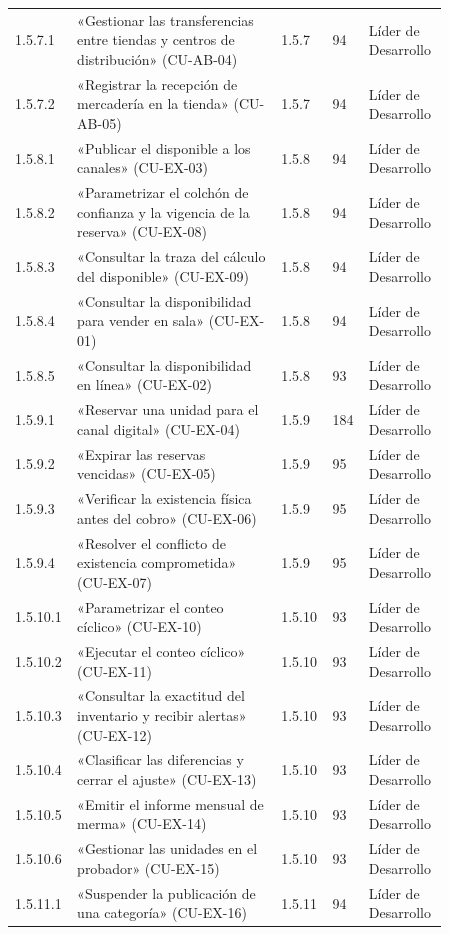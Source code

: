 \begin{longtable}{@{}p{0.075\linewidth}p{0.451\linewidth}p{0.075\linewidth}p{0.075\linewidth}p{0.179\linewidth}@{}}
1.5.7.1 & «Gestionar las transferencias entre tiendas y centros de distribución» (CU-AB-04) & 1.5.7 & 94 & Líder de Desarrollo \\
1.5.7.2 & «Registrar la recepción de mercadería en la tienda» (CU-AB-05) & 1.5.7 & 94 & Líder de Desarrollo \\
1.5.8.1 & «Publicar el disponible a los canales» (CU-EX-03) & 1.5.8 & 94 & Líder de Desarrollo \\
1.5.8.2 & «Parametrizar el colchón de confianza y la vigencia de la reserva» (CU-EX-08) & 1.5.8 & 94 & Líder de Desarrollo \\
1.5.8.3 & «Consultar la traza del cálculo del disponible» (CU-EX-09) & 1.5.8 & 94 & Líder de Desarrollo \\
1.5.8.4 & «Consultar la disponibilidad para vender en sala» (CU-EX-01) & 1.5.8 & 94 & Líder de Desarrollo \\
1.5.8.5 & «Consultar la disponibilidad en línea» (CU-EX-02) & 1.5.8 & 93 & Líder de Desarrollo \\
1.5.9.1 & «Reservar una unidad para el canal digital» (CU-EX-04) & 1.5.9 & 184 & Líder de Desarrollo \\
1.5.9.2 & «Expirar las reservas vencidas» (CU-EX-05) & 1.5.9 & 95 & Líder de Desarrollo \\
1.5.9.3 & «Verificar la existencia física antes del cobro» (CU-EX-06) & 1.5.9 & 95 & Líder de Desarrollo \\
1.5.9.4 & «Resolver el conflicto de existencia comprometida» (CU-EX-07) & 1.5.9 & 95 & Líder de Desarrollo \\
1.5.10.1 & «Parametrizar el conteo cíclico» (CU-EX-10) & 1.5.10 & 93 & Líder de Desarrollo \\
1.5.10.2 & «Ejecutar el conteo cíclico» (CU-EX-11) & 1.5.10 & 93 & Líder de Desarrollo \\
1.5.10.3 & «Consultar la exactitud del inventario y recibir alertas» (CU-EX-12) & 1.5.10 & 93 & Líder de Desarrollo \\
1.5.10.4 & «Clasificar las diferencias y cerrar el ajuste» (CU-EX-13) & 1.5.10 & 93 & Líder de Desarrollo \\
1.5.10.5 & «Emitir el informe mensual de merma» (CU-EX-14) & 1.5.10 & 93 & Líder de Desarrollo \\
1.5.10.6 & «Gestionar las unidades en el probador» (CU-EX-15) & 1.5.10 & 93 & Líder de Desarrollo \\
1.5.11.1 & «Suspender la publicación de una categoría» (CU-EX-16) & 1.5.11 & 94 & Líder de Desarrollo \\

\end{longtable}
